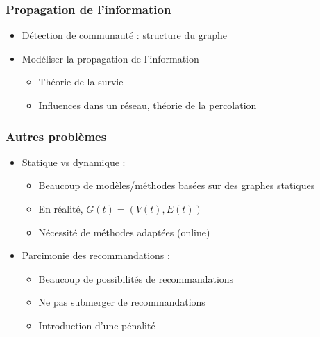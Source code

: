 \documentclass[c]{beamer}
\begin{document}
\begin{frame}
\begin{columns}
\begin{column}{.3\textwidth}
\begin{figure}
            \end{figure}
        \end{column}
    \end{columns}
\end{frame}

\begin{frame}
    \frametitle{Propagation de l'information}

    \begin{itemize}
        \item<1-> Détection de communauté : structure du graphe
        \item<2-> Modéliser la propagation de l'information
            \begin{itemize}
                \item Théorie de la survie
                \item Influences dans un réseau, théorie de la percolation
            \end{itemize}
    \end{itemize}
\end{frame}

\begin{frame}
    \frametitle{Autres problèmes}

    \begin{itemize}
        \item<1-> Statique vs dynamique :
            \begin{itemize}
                \item Beaucoup de modèles/méthodes basées sur des graphes statiques
                \item En réalité, $G(t) = (V(t), E(t))$
                \item Nécessité de méthodes adaptées (online)
            \end{itemize}
        \item<2-> Parcimonie des recommandations :
            \begin{itemize}
                \item Beaucoup de possibilités de recommandations
                \item Ne pas submerger de recommandations
                \item Introduction d'une pénalité
            \end{itemize}
    \end{itemize}
\end{frame}
\end{document}
